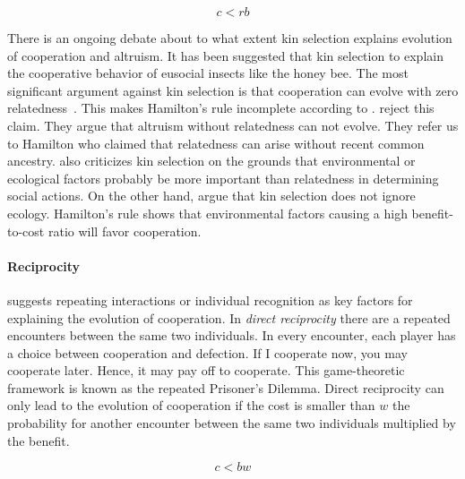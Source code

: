 \documentclass[12pt]{extarticle}
\begin{document}
\begin{equation} \label{eq:hamilton_rule}
c<rb
\end{equation}

There is an ongoing debate about to what extent kin selection explains evolution of cooperation and altruism.
It has been suggested that kin selection to explain the cooperative behavior of eusocial insects like the honey bee.
The most significant argument against kin selection is that cooperation can evolve with zero relatedness~\citep{wilson2005kin}. This makes Hamilton's rule incomplete according to \citet{wilson2005kin}. \citet{foster2006kin} reject this claim. They argue that altruism without relatedness can not evolve. They refer us to Hamilton who claimed that relatedness can arise without recent common ancestry. 
\citet{wilson2005kin} also criticizes kin selection on the grounds that environmental or ecological factors probably be more important than relatedness in determining social actions. On the other hand, \citet{foster2006kin} argue that kin selection does not ignore ecology. Hamilton’s rule shows
that environmental factors causing a high benefit-to-cost ratio will favor cooperation.

\paragraph{Reciprocity} suggests repeating interactions or individual recognition as key factors for explaining the evolution of cooperation. In \emph{direct reciprocity} there are a repeated encounters between the same two individuals. In every encounter, each player has a choice between cooperation and defection. If I cooperate now, you may cooperate later. Hence, it may pay off to cooperate.
This game-theoretic framework is known as the repeated Prisoner's Dilemma. 
Direct reciprocity can only lead to the evolution of cooperation if the cost is smaller than $w$ the probability for another encounter between the same two individuals multiplied by the benefit. 

\begin{equation} \label{eq:reciprocity}
c<bw
\end{equation}
\end{document}
